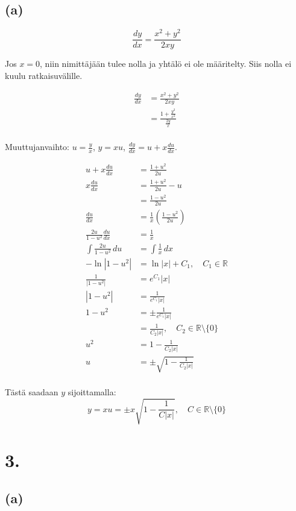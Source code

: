 \documentclass{article}
\begin{document}
\subsection*{(a)}

\[
  \frac{dy}{dx} = \frac{x^2 + y^2}{2xy}
\]

Jos $x = 0$, niin nimittäjään tulee nolla ja yhtälö ei ole määritelty.
Siis nolla ei kuulu ratkaisuvälille.

\begin{align*}
  \frac{dy}{dx} &= \frac{x^2 + y^2}{2xy} \\
                &= \frac{1 + \frac{y^2}{x^2}}{\frac{2y}{x}} \\
\end{align*}

Muuttujanvaihto: $u = \frac{y}{x}$, $y = xu$, $\frac{dy}{dx} = u + x\frac{du}{dx}$.

\begin{align*}
  u + x\frac{du}{dx} &= \frac{1 + u^2}{2u} \\
  x\frac{du}{dx} &= \frac{1 + u^2}{2u} - u \\
                 &= \frac{1 - u^2}{2u} \\
  \frac{du}{dx} &= \frac{1}{x}(\frac{1 - u^2}{2u}) \\
  \frac{2u}{1 - u^2}\frac{du}{dx} &= \frac{1}{x} \\
  \int\frac{2u}{1 - u^2}\,du &= \int \frac{1}{x}\,dx \\
  -\ln |1 - u^2| &= \ln |x| + C_1, \quad C_1 \in \mathbb{R} \\
  \frac{1}{|1 - u^2|} &= e^{C_1} |x| \\
  |1 - u^2| &= \frac{1}{e^{C_1} |x|} \\
  1 - u^2 &= \pm \frac{1}{e^{C_1} |x|} \\
          &= \frac{1}{C_2 |x|}, \quad C_2 \in \mathbb{R} \setminus \{0\} \\
  u^2 &= 1 - \frac{1}{C_2 |x|} \\
  u &= \pm \sqrt{1 - \frac{1}{C_2 |x|}} \\
\end{align*}

Tästä saadaan $y$ sijoittamalla:
\[
  y = xu = \pm x\sqrt{1 - \frac{1}{C |x|}}, \quad C \in \mathbb{R} \setminus \{0\}
\]

\section*{3.}

\subsection*{(a)}
\end{document}

